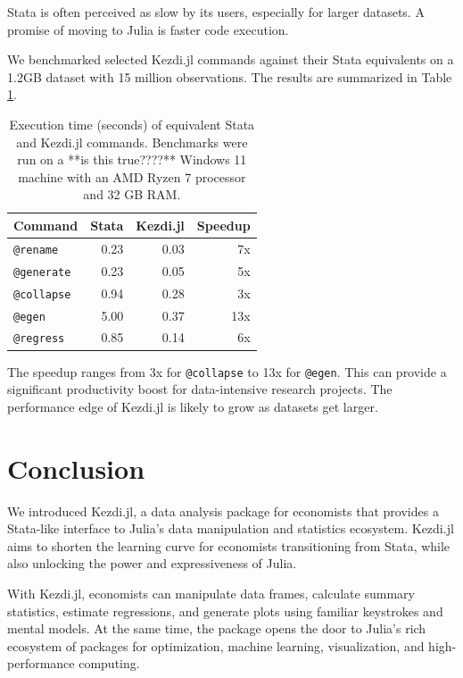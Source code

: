 \documentclass{juliacon}
\begin{document}
Stata is often perceived as slow by its users, especially for larger datasets. A promise of moving to Julia is faster code execution.

We benchmarked selected Kezdi.jl commands against their Stata equivalents on a 1.2GB dataset with 15 million observations. The results are summarized in Table \ref{tab:benchmark}.

\begin{table}[ht]
	\centering
	\begin{tabular}{lrrr}
		\hline
		Command            & Stata & Kezdi.jl & Speedup \\
		\hline
		\texttt{@rename}   & 0.23  & 0.03     & 7x      \\
		\texttt{@generate} & 0.23  & 0.05     & 5x      \\
		\texttt{@collapse} & 0.94  & 0.28     & 3x      \\
		\texttt{@egen}     & 5.00  & 0.37     & 13x     \\
		\texttt{@regress}  & 0.85  & 0.14     & 6x      \\
		\hline
	\end{tabular}
	\caption{Execution time (seconds) of equivalent Stata and Kezdi.jl commands. Benchmarks were run on a **is this true????** Windows 11 machine with an AMD Ryzen 7 processor and 32 GB RAM.}
	\label{tab:benchmark}
\end{table}

The speedup ranges from 3x for \texttt{@collapse} to 13x for \texttt{@egen}. This can provide a significant productivity boost for data-intensive research projects. The performance edge of Kezdi.jl is likely to grow as datasets get larger.

\section{Conclusion}

We introduced Kezdi.jl, a data analysis package for economists that provides a Stata-like interface to Julia's data manipulation and statistics ecosystem. Kezdi.jl aims to shorten the learning curve for economists transitioning from Stata, while also unlocking the power and expressiveness of Julia.

With Kezdi.jl, economists can manipulate data frames, calculate summary statistics, estimate regressions, and generate plots using familiar keystrokes and mental models. At the same time, the package opens the door to Julia's rich ecosystem of packages for optimization, machine learning, visualization, and high-performance computing.
\end{document}

